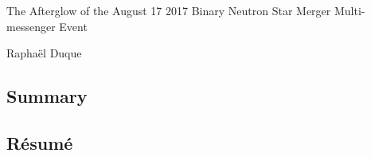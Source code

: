 \begin{center}

{\huge The Afterglow of the August 17 2017 Binary Neutron Star Merger Multi-messenger Event}

Raphaël Duque

\end{center}

\newpage

\subsection*{Summary}


\vfill

\subsection*{Résumé}